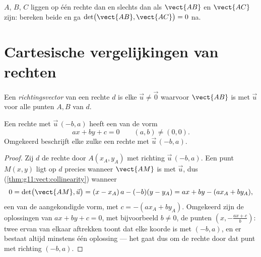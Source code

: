 \begin{method}\label{met:g11:vect:alignment}
$A$, $B$, $C$ liggen op één rechte dan en slechts dan als $\vect{AB}$ en
$\vect{AC}$  zijn: bereken beide  en ga
$\det\bigl(\vect{AB}, \vect{AC}\bigr) = 0$ na.
\end{method}

\section{Cartesische vergelijkingen van rechten}

\begin{definition}[Richtingsvector]\label{def:g11:vect:direction}
Een \emph{richtingsvector} van een rechte $d$ is elke
 $\vec u \neq \vec 0$ waarvoor $\vect{AB}$  is met $\vec u$
voor alle punten $A, B$ van $d$.
\end{definition}

\begin{theorem}\label{thm:g11:vect:cartesian}
Een rechte met  $\vec u\,(-b, a)$ heeft een  van
de vorm
\[
ax + by + c = 0
\qquad (a, b) \neq (0, 0).
\]
Omgekeerd beschrijft elke zulke  een rechte met 
$\vec u\,(-b, a)$.
\end{theorem}

\begin{proof}
Zij $d$ de rechte door $A(x_A, y_A)$ met richting $\vec u\,(-b, a)$. Een
punt $M(x, y)$ ligt op $d$ precies wanneer $\vect{AM}$  is met
$\vec u$, dus (\cref{thm:g11:vect:collinearity}) wanneer
\[
0 = \det\bigl(\vect{AM}, \vec u\bigr)
= (x - x_A)\,a - (-b)(y - y_A)
= ax + by - (a x_A + b y_A),
\]
een  van de aangekondigde vorm, met $c = -(a x_A + b y_A)$.
Omgekeerd zijn de oplossingen van $ax + by + c = 0$, met bijvoorbeeld
$b \neq 0$, de punten $\left(x, -\frac{a x + c}{b}\right)$: twee ervan van
elkaar aftrekken toont dat elke koorde  is met $(-b, a)$, en er
bestaat altijd minstens één oplossing --- het gaat dus om de rechte door dat
punt met richting $(-b, a)$.
\end{proof}


